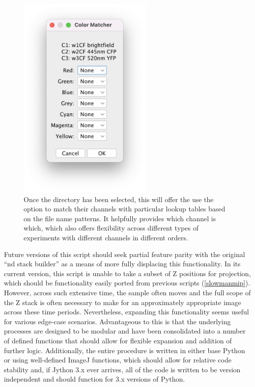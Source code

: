 \begin{figure}
\centering
\includegraphics[height=4in]{images/colormatcher.png}
\caption[Second part of the GUI for metamorpher, allowing the user to select the false colors for the different image channels]{Once the directory has been selected, this will offer the use the option to match their channels with particular lookup tables based on the file name patterns. It helpfully provides which channel is which, which also offers flexibility across different types of experiments with different channels in different orders.}
\label{figure:metacolormatcher}
\end{figure}

Future versions of this script should seek partial feature parity with the original ``nd stack builder'' as a means of more fully displacing this functionality. In its current version, this script is unable to take a subset of Z positions for projection, which should be functionality easily ported from previous scripts (\autoref{slowmanmip}). However, across such extensive time, the sample often moves and the full scope of the Z stack is often necessary to make for an approximately appropriate image across these time periods. Nevertheless, expanding this functionality seems useful for various edge\hyp{}case scenarios. Advantageous to this is that the underlying processes are designed to be modular and have been consolidated into a number of defined functions that should allow for flexible expansion and addition of further logic. Additionally, the entire procedure is written in either base Python or using well\hyp{}defined ImageJ functions, which should allow for relative code stability and, if Jython 3.x ever arrives, all of the code is written to be version independent and should function for 3.x versions of Python.

